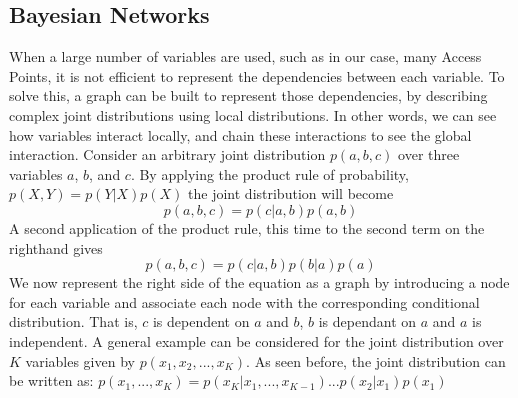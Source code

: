 \subsection{Bayesian Networks}
When a large number of variables are used, such as in our case, many Access Points, it is not efficient to represent the dependencies between each variable. To solve this, a graph can be built to represent those dependencies, by describing complex joint distributions using local distributions. In other words, we can see how variables interact locally, and chain these interactions to see the global interaction.
Consider an arbitrary joint distribution $p(a,b,c)$ over three variables $a$, $b$, and $c$.
By applying the product rule of probability, $p(X,Y) = p(Y|X)p(X)$ the joint distribution will become $$p(a,b,c) = p(c|a,b)p(a,b)$$
A second application of the product rule, this time to the second term on the righthand gives $$p(a,b,c) = p(c|a, b)p(b|a)p(a)$$
We now represent the right side of the equation as a graph by introducing a node for each variable and associate each node with the corresponding conditional distribution. That is, $c$ is dependent on $a$ and $b$, $b$ is dependant on $a$ and $a$ is independent. A general example can be considered for the joint distribution over $K$ variables given by $p(x_1,x_2,...,x_K)$. As seen before, the joint distribution can be written as: $p(x_1,...,x_K) = p(x_K|x_1,...,x_{K-1})...p(x_2|x_1)p(x_1)$



